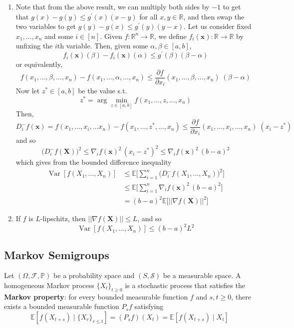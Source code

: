 \documentclass{article}
\DeclareMathOperator{\Var}{Var}
\begin{document}
\begin{solution}
\begin{enumerate}
      \item Note that from the above result, we can multiply both sides by $-1$ to get that $g(x) - g(y) \leq g^\prime (x) (x - y)$ for all $x, y \in \mathbb{R}$, and then swap the two variables to get $g(y) - g(x) \leq g^\prime (y) (y - x)$. Let us consider fixed $x_1, \ldots, x_n$ and some $i \in [n]$. Given $f: \mathbb{R}^n \rightarrow \mathbb{R}$, we define $f_i (\mathbf{x}): \mathbb{R} \rightarrow \mathbb{R}$ by unfixing the $i$th variable. Then, given some $\alpha, \beta \in [a, b]$, 
      \[f_i (\mathbf{x}) (\beta) - f_i (\mathbf{x}) (\alpha) \leq g^\prime (\beta) (\beta - \alpha)\]
      or equivalently, 
      \[f(x_1, \ldots, \beta, \ldots, x_n) - f(x_1, \ldots, \alpha, \ldots, x_n) \leq \frac{\partial f}{\partial x_i} (x_1, \ldots, \beta, \ldots, x_n) \; (\beta - \alpha)\]
      Now let $z^\ast \in [a, b]$ be the value s.t. 
      \[z^\ast = \arg \min_{z \in [a, b]} f(x_1, \ldots, z, \ldots, x_n) \]
      Then, 
      \[D_i^- f(\mathbf{x}) = f(x_1, \ldots, x_i, \ldots x_n) - f(x_1, \ldots, z^\ast, \ldots, x_n) \leq \frac{\partial f}{\partial x_i} (x_1, \ldots, x_i, \ldots, x_n) \; (x_i - z^\ast)\]
      and so 
      \[\big( D_i^- f(\mathbf{X}) \big)^2 \leq \nabla_i f (\mathbf{x})^2 \, (x_i - z^\ast)^2 \leq \nabla_i f (\mathbf{x})^2 \, (b - a)^2\]
      which gives from the bounded difference inequality 
      \begin{align*}
          \Var[f(X_1, \ldots, X_n)] & \leq \mathbb{E} \bigg[ \sum_{i=1}^n \big( D_i^- f(X_1, \ldots, X_n) \big)^2 \bigg] \\
          & \leq \mathbb{E} \bigg[ \sum_{i=1}^n \nabla_i f (\mathbf{x})^2 \, (b - a)^2 \bigg] \\
          & = (b - a)^2 \mathbb{E} \big[ \big| \big| \nabla f(\mathbf{X})\big| \big|^2 \big]
      \end{align*}
      
      \item If $f$ is $L$-lipschitz, then $||\nabla f(\mathbf{X})|| \leq L$, and so  
      \[\Var[f(X_1, \ldots, X_n)] \leq (b - a)^2 L^2\]
  \end{enumerate}
  \end{solution}

  \subsection{Markov Semigroups}

  \begin{definition}
  Let $(\Omega, \mathcal{F}, \mathbb{P})$ be a probability space and $(S, \mathcal{S})$ be a measurable space. A homogeneous Markov process $\{X_t\}_{t \geq 0}$ is a stochastic process that satisfies the \textbf{Markov property}: for every bounded measurable function $f$ and $s, t \geq 0$, there exists a bounded measurable function $P_s f$ satisfying 
  \[\mathbb{E}[f (X_{t + s}) \mid \{X_r\}_{r \leq t}] = (P_s f) (X_t) = \mathbb{E}[ f(X_{t + s}) \mid X_t]\]
  \end{definition}
\end{document}
